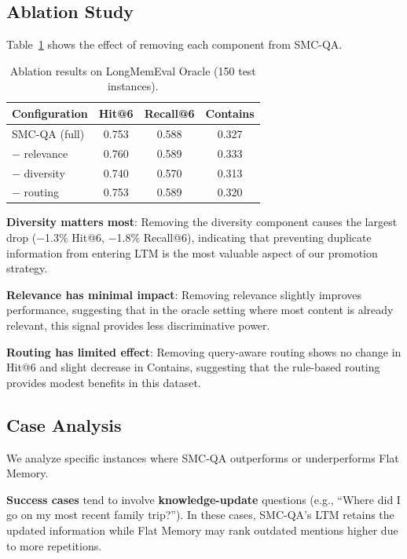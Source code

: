 \documentclass{article}
\begin{document}
\subsection{Ablation Study}

Table~\ref{tab:ablation} shows the effect of removing each component from SMC-QA.

\begin{table}[h]
\centering
\caption{Ablation results on LongMemEval Oracle (150 test instances).}
\label{tab:ablation}
\begin{tabular}{lccc}
\toprule
\textbf{Configuration} & \textbf{Hit@6} & \textbf{Recall@6} & \textbf{Contains} \\
\midrule
SMC-QA (full) & 0.753 & 0.588 & 0.327 \\
$-$ relevance & 0.760 & 0.589 & 0.333 \\
$-$ diversity & 0.740 & 0.570 & 0.313 \\
$-$ routing & 0.753 & 0.589 & 0.320 \\
\bottomrule
\end{tabular}
\end{table}

\textbf{Diversity matters most}: Removing the diversity component causes the largest drop ($-$1.3\% Hit@6, $-$1.8\% Recall@6), indicating that preventing duplicate information from entering LTM is the most valuable aspect of our promotion strategy.

\textbf{Relevance has minimal impact}: Removing relevance slightly improves performance, suggesting that in the oracle setting where most content is already relevant, this signal provides less discriminative power.

\textbf{Routing has limited effect}: Removing query-aware routing shows no change in Hit@6 and slight decrease in Contains, suggesting that the rule-based routing provides modest benefits in this dataset.

\subsection{Case Analysis}

We analyze specific instances where SMC-QA outperforms or underperforms Flat Memory.

\textbf{Success cases} tend to involve \textbf{knowledge-update} questions (e.g., ``Where did I go on my most recent family trip?''). In these cases, SMC-QA's LTM retains the updated information while Flat Memory may rank outdated mentions higher due to more repetitions.
\end{document}

